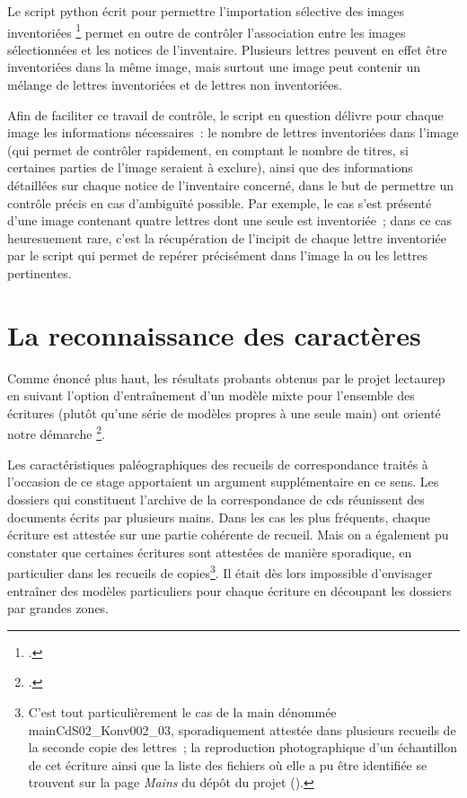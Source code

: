 \documentclass[a4paper,12pt,twoside]{book}
\begin{document}
	    		Le script python écrit pour permettre l'importation sélective des images inventoriées \footcite{biayDonneesImagesPy2022} permet en outre de contrôler l'association entre les images sélectionnées et les notices de l'inventaire. Plusieurs lettres peuvent en effet être inventoriées dans la même image, mais surtout une image peut contenir un mélange de lettres inventoriées et de lettres non inventoriées.
	    		

	    		
	    		Afin de faciliter ce travail de contrôle, le script en question délivre pour chaque image les informations nécessaires~: le nombre de lettres inventoriées dans l'image (qui permet de contrôler rapidement, en comptant le nombre de titres, si certaines parties de l'image seraient à exclure), ainsi que des informations détaillées sur chaque notice de l'inventaire concerné, dans le but de permettre un contrôle précis en cas d'ambiguïté possible. Par exemple, le cas s'est présenté d'une image contenant quatre lettres dont une seule est inventoriée~; dans ce cas heuresuement rare, c'est la récupération de l'incipit de chaque lettre inventoriée par le script qui permet de repérer précisément dans l'image la ou les lettres pertinentes.
				
		\section{La reconnaissance des caractères}
			Comme énoncé plus haut, les résultats probants obtenus par le projet \gls{lectaurep} en suivant l'option d'entraînement d'un modèle mixte pour l'ensemble des écritures (plutôt qu'une série de modèles propres à une seule main) ont orienté notre démarche \footcite{chagueCreationModelesTranscriptiona}.
			
			Les caractéristiques paléographiques des recueils de correspondance traités à l'occasion de ce stage apportaient un argument supplémentaire en ce sens. Les dossiers qui constituent l'archive de la correspondance de \gls{cds} réunissent des documents écrits par plusieurs mains. Dans les cas les plus fréquents, chaque écriture est attestée sur une partie cohérente de recueil. Mais on a également pu constater que certaines écritures sont attestées de manière sporadique, en particulier dans les recueils de copies\footnote{C'est tout particulièrement le cas de la main dénommée mainCdS02\_Konv002\_03, sporadiquement attestée dans plusieurs recueils de la seconde copie des lettres~; la reproduction photographique d'un échantillon de cet écriture ainsi que la liste des fichiers où elle a pu être identifiée se trouvent sur la page \textit{Mains} du dépôt du projet (\cite{biayMains2022}).}. Il était dès lors impossible d'envisager entraîner des modèles particuliers pour chaque écriture en découpant les dossiers par grandes zones.
			
\end{document}
